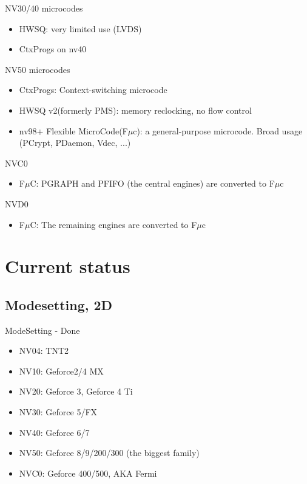\documentclass[11pt,english,compress]{beamer}
\begin{document}
		\begin{frame}
			\begin{block}{NV30/40 microcodes}
				\begin{itemize}
					\item HWSQ: very limited use (LVDS)
					\item CtxProgs on nv40
				\end{itemize}
			\end{block}

			\begin{block}{NV50 microcodes}
				\begin{itemize}
					\item CtxProgs: Context-switching microcode 
					\item HWSQ v2(formerly PMS): memory reclocking, no flow control
					\item nv98+ Flexible MicroCode(F$\mu$c): a general-purpose microcode. Broad usage (PCrypt, PDaemon, Vdec, ...)
				\end{itemize}
			\end{block}

			\begin{block}{NVC0}
				\begin{itemize}
					\item F$\mu$C: PGRAPH and PFIFO (the central engines) are converted to F$\mu$c
				\end{itemize}
			\end{block}

			\begin{block}{NVD0}
				\begin{itemize}
					\item F$\mu$C: The remaining engines are converted to F$\mu$c
				\end{itemize}
			\end{block}
		\end{frame}

\section{Current status}
	\subsection{Modesetting, 2D}
		\begin{frame}
			\begin{block}{ModeSetting - Done}
				\begin{itemize}
					\item NV04: TNT2
					\item NV10: Geforce2/4 MX
					\item NV20: Geforce 3, Geforce 4 Ti
					\item NV30: Geforce 5/FX
					\item NV40: Geforce 6/7
					\item NV50: Geforce 8/9/200/300 (the biggest family)
					\item NVC0: Geforce 400/500, AKA Fermi
				\end{itemize}
			\end{block}
		\end{frame}
\end{document}
